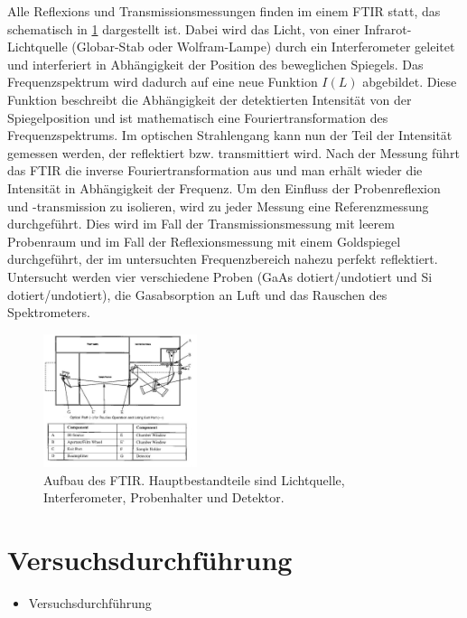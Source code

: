 \documentclass[paper=a4,fontsize=10pt,DIV=18,twocolumn,parskip=half]{scrartcl}
\numberwithin{equation}{section}    %
\begin{document}
Alle Reflexions und Transmissionsmessungen finden im einem  FTIR statt, das 
schematisch in \ref{ftir} dargestellt ist. Dabei wird das Licht, von einer 
Infrarot-Lichtquelle (Globar-Stab oder Wolfram-Lampe) durch ein Interferometer 
geleitet und interferiert in Abhängigkeit der Position des beweglichen Spiegels. 
Das Frequenzspektrum wird dadurch auf eine neue Funktion $I(L)$ abgebildet. 
Diese Funktion beschreibt die Abhängigkeit der detektierten Intensität von der 
Spiegelposition und ist mathematisch eine Fouriertransformation des 
Frequenzspektrums. Im optischen Strahlengang kann nun der Teil der Intensität 
gemessen werden, der reflektiert bzw. transmittiert wird. Nach der Messung führt 
das FTIR die inverse Fouriertransformation aus und man erhält wieder die  
Intensität in Abhängigkeit der Frequenz. Um den Einfluss der Probenreflexion und 
-transmission zu isolieren, wird zu jeder Messung eine Referenzmessung 
durchgeführt. Dies wird im Fall der Transmissionsmessung mit leerem Probenraum 
und im Fall der Reflexionsmessung mit einem Goldspiegel durchgeführt, der im 
untersuchten Frequenzbereich nahezu perfekt reflektiert.
Untersucht werden vier verschiedene Proben (GaAs dotiert/undotiert und Si 
dotiert/undotiert), die Gasabsorption an Luft und das Rauschen des 
Spektrometers.

\begin{figure}
\centering
    \includegraphics[width=0.4\textwidth]{Bilder/FTIR}
    \caption{Aufbau des FTIR. Hauptbestandteile sind Lichtquelle, 
    Interferometer, Probenhalter und Detektor.}
    \label{ftir}
\end{figure}


\section{Versuchsdurchführung}
\begin{itemize}
\item Versuchsdurchführung
\end{itemize}
\end{document}
